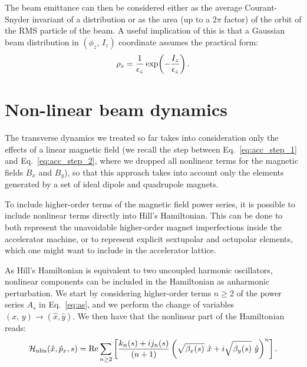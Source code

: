 The beam emittance can then be considered either as the average Courant-Snyder invariant of a distribution or as the area (up to a $2\pi$ factor) of the orbit of the RMS particle of the beam. A useful implication of this is that a Gaussian beam distribution in $(\phi_z,\,I_z)$ coordinate assumes the practical form:
%
\begin{equation}
\rho_z = \frac{1}{\epsilon_z}\exp(-\frac{I_z}{\epsilon_z})\,.
\end{equation}
%



\section{Non-linear beam dynamics}\label{sec:non-linear}

The transverse dynamics we treated so far takes into consideration only the effects of a linear magnetic field (we recall the step between Eq.~\eqref{eq:acc_step_1} and Eq.~\eqref{eq:acc_step_2}, where we dropped all nonlinear terms for the magnetic fields $B_x$ and $B_y$), so that this approach takes into account only the elements generated by a set of ideal dipole and quadrupole magnets.

To include higher-order terms of the magnetic field power series, it is possible to include nonlinear terms directly into Hill's Hamiltonian. This can be done to both represent the unavoidable higher-order magnet imperfections inside the accelerator machine, or to represent explicit sextupolar and octupolar elements, which one might want to include in the accelerator lattice. 

As Hill's Hamiltonian is equivalent to two uncoupled harmonic oscillators, nonlinear components can be included in the Hamiltonian as anharmonic perturbation. We start by considering higher-order terms $n \ge 2$ of the power series $A_s$ in Eq.~\eqref{eq:as}, and we perform the change of variables $(x,\,y) \to (\hat x, \hat y)$. We then have that the nonlinear part of the Hamiltonian reads:
%
\begin{equation}
    \mathcal{H}_\text{nlin}(\hat x, \hat p_x, s) = \Re \sum_{n\ge 2} \qty[\frac{k_n(s) + ij_n(s)}{(n+1)} \left(\sqrt{\beta_x(s)}\ \hat x + i\sqrt{\beta_y(s)}\ \hat y\right)^n]\,.
\end{equation}  

